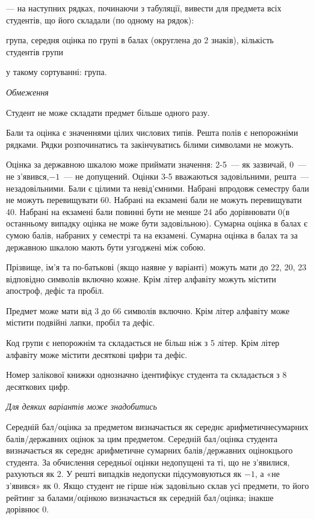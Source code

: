 \documentclass[11pt, ukrainian]{article}
\begin{document}
{\noindent}--- на наступних рядках, починаючи з табуляції, вивести для предмета всіх студентів, що його складали (по одному на рядок):\par
група, середня оцінка по групі в балах (округлена до 2 знаків), кількість студентів групи

{\noindent}у такому сортуванні: група.


\bigskip\textit{Обмеження}

Студент не може складати предмет більше одного разу.

Бали та оцінка є значеннями цілих числових типів. Решта полів є непорожніми рядками.
Рядки розпочинатись та закінчуватись білими символами не можуть.

Оцінка за державною шкалою може приймати значення: 2-5~--- як зазвичай, 0~--- не з’явився,$-1$~--- не допущений. 
Оцінки 3-5 вважаються задовільними, решта~--- незадовільними. 
Бали є цілими та невід’ємними.
Набрані впродовж семестру бали не можуть перевищувати 60. 
Набрані на екзамені бали не можуть перевищувати 40. 
Набрані на екзамені бали повинні бути не менше 24 або дорівнювати 0(в останньому випадку оцінка не може бути задовільною). 
Сумарна оцінка в балах є сумою балів, набраних у семестрі та на екзамені.
Сумарна оцінка в балах та за державною шкалою мають бути узгоджені між собою.

Прізвище, ім’я та по-батькові (якщо наявне у варіанті) можуть мати до 22, 20, 23 відповідно символів включно кожне. 
Крім літер алфавіту можуть містити апостроф, дефіс та пробіл.

Предмет може мати від 3 до 66 символів включно. 
Крім літер алфавіту може містити подвійні лапки, пробіл та дефіс.

Код групи є непорожнім та складається не більш ніж з 5 літер. 
Крім літер алфавіту може містити десяткові цифри та дефіс.


Номер залікової книжки однозначно ідентифікує студента та складається з 8 десяткових цифр. 

\bigskip\textit{Для деяких варіантів може знадобитись}

Середній бал/оцінка за предметом визначається як середнє арифметичнесумарних балів/державних оцінок за цим предметом. 
Середній бал/оцінка студента визначається як середнє арифметичне сумарних балів/державних оцінокцього студента. 
За обчислення середньої оцінки недопущені та ті, що не з’явилися, рахуються як 2.
У решті випадків недопуски підсумовуються як $-1$, а «не з’явився» як 0.
Якщо студент не гірше ніж задовільно склав усі предмети, 
то його рейтинг за балами/оцінкою визначається як середній бал/оцінка; інакше дорівнює 0.
\end{document}
